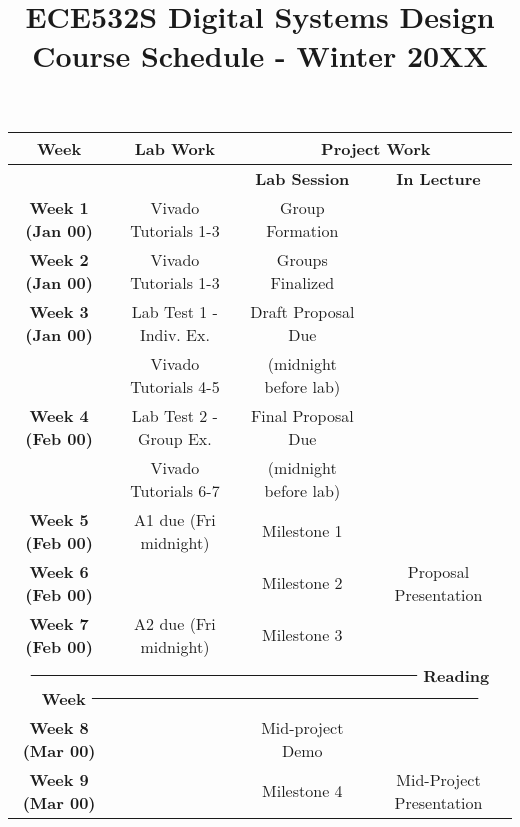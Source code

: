 \documentclass[11pt]{article}
\title{ECE532S Digital Systems Design \\ \vspace{0.4cm}
       \Large Course Schedule - Winter 20XX}
\author{ }
\date{ }
\begin{document}
\maketitle
\vspace{-1cm}

\begin{center}
    
\begin{tabular}{|c|c|c|c|}
    \hline
    \textbf{Week} & \textbf{Lab Work} & \multicolumn{2}{c|}{\textbf{Project Work}} \\
    
    \hline
     & & \textbf{Lab Session} & \textbf{In Lecture} \\
    
    \hline
    \textbf{Week 1 (Jan 00)} & Vivado Tutorials 1-3 & Group Formation& \\
    
    \hline
    \textbf{Week 2 (Jan 00)} & Vivado Tutorials 1-3 & Groups Finalized& \\
    
    \hline
    \textbf{Week 3 (Jan 00)} & Lab Test 1 - Indiv. Ex.  & Draft Proposal Due & \\
     & Vivado Tutorials 4-5 & (midnight before lab) & \\
    
    \hline
    \textbf{Week 4 (Feb 00)} & Lab Test 2 - Group Ex.& Final Proposal Due & \\
     & Vivado Tutorials 6-7 & (midnight before lab) & \\
    
    \hline
    \textbf{Week 5 (Feb 00)} & A1 due (Fri midnight)& Milestone 1 & \\
    
    \hline
    \textbf{Week 6 (Feb 00)} & & Milestone 2 & Proposal Presentation \\
    
    \hline
    \textbf{Week 7 (Feb 00)} & A2 due (Fri midnight) &  Milestone 3 & \\
    
    \hline
    \multicolumn{4}{|c|}{\textbf{ \sout{~~~~~~~~~~~~~~~~~~~~~~~~~~~~~~~~~~~~~~~~~~} \textbf{Reading Week} \sout{~~~~~~~~~~~~~~~~~~~~~~~~~~~~~~~~~~~~~~~~~~}  }} \\

    \hline
    \textbf{Week 8 (Mar 00)} & & Mid-project Demo & \\
    
    \hline
    \textbf{Week 9 (Mar 00)} & & Milestone 4 & Mid-Project Presentation \\
    

\end{tabular}
\end{center}
\end{document}
